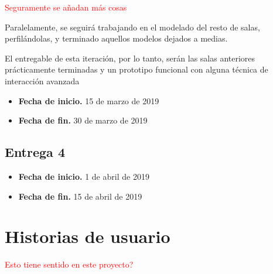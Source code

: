 \textcolor{red}{Seguramente se añadan más cosas}

Paralelamente, se seguirá trabajando en el modelado del resto de salas, perfilándolas, y terminado aquellos modelos dejados a medias.

El entregable de esta iteración, por lo tanto, serán las salas anteriores prácticamente terminadas y un prototipo funcional con alguna técnica de interacción avanzada

\begin{itemize}
    \item \textbf{Fecha de inicio.} 15 de marzo de 2019
    \item \textbf{Fecha de fin.} 30 de marzo de 2019
\end{itemize}

\subsection{Entrega 4}

\begin{itemize}
    \item \textbf{Fecha de inicio.} 1 de abril de 2019
    \item \textbf{Fecha de fin.} 15 de abril de 2019
\end{itemize}

\section{Historias de usuario}

\textcolor{red}{Esto tiene sentido en este proyecto?}


